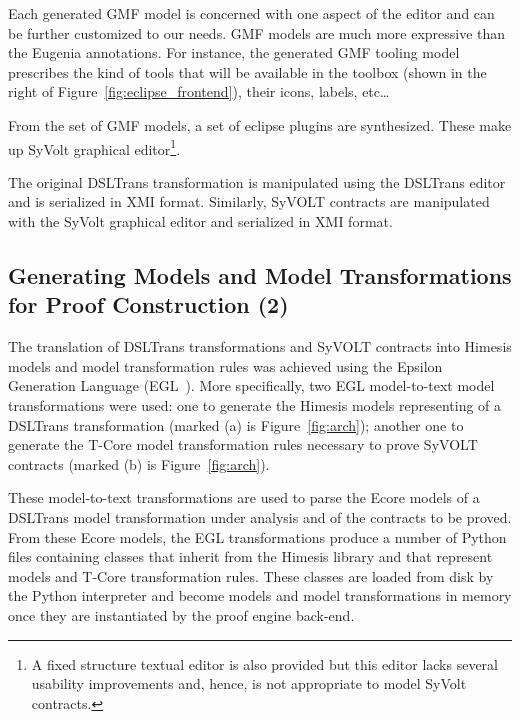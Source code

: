 Each generated GMF model is concerned with one aspect of the editor and can be
further customized to our needs. GMF models are much more expressive than the
Eugenia annotations.
For instance, the generated GMF tooling model prescribes the kind of tools that
will be available in the toolbox (shown in the right of
Figure~\ref{fig:eclipse_frontend}), their icons, labels, etc\ldots

From the set of GMF models, a set of eclipse plugins are synthesized.
These make up SyVolt graphical editor\footnote{A fixed structure textual editor
is also provided but this editor lacks several usability improvements and,
hence, is not appropriate to model SyVolt contracts.}.

The original DSLTrans transformation is manipulated using the DSLTrans editor
and is serialized in XMI format. Similarly, SyVOLT contracts are manipulated with the SyVolt graphical
editor and serialized in XMI format.


\subsection{Generating Models and Model Transformations for Proof Construction
(2)}
\label{sec:gen_models_mt}

The translation of DSLTrans transformations and SyVOLT contracts into Himesis
models and model transformation rules was achieved using the Epsilon Generation
Language (EGL~\cite{Rose2008}). More specifically, two EGL model-to-text model
transformations were used: one to generate the Himesis models representing of a DSLTrans transformation (marked (a) is
Figure~\ref{fig:arch}); another one to generate the T-Core model transformation
rules necessary to prove SyVOLT contracts (marked (b) is Figure~\ref{fig:arch}).

These model-to-text transformations are used to parse the Ecore models of a
DSLTrans model transformation under analysis and of the contracts to be proved.
From these Ecore models, the EGL transformations produce a number of Python
files containing classes that inherit from the Himesis library and that
represent models and T-Core transformation rules. These classes are loaded from
disk by the Python interpreter and become models and model transformations in
memory once they are instantiated by the proof engine back-end.

